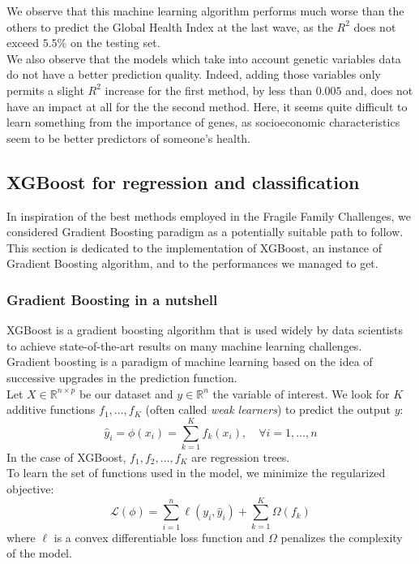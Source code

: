 \documentclass[]{article}
\begin{document}
\noindent
We observe that this machine learning algorithm performs much worse than the others to predict the Global Health Index at the last wave, as the $R^2$ does not exceed $5.5\%$ on the testing set.\\
We also observe that the models which take into account genetic variables data do not have a better prediction quality. Indeed, adding those variables only permits a slight $R^2$ increase for the first method, by less than $0.005$ and, does not have an impact at all for the the second method. Here, it seems quite difficult to learn something from the importance of genes, as socioeconomic characteristics seem to be better predictors of someone's health.

\subsection{XGBoost for regression and classification}
In inspiration of the best methods employed in the Fragile Family Challenges, we considered Gradient Boosting paradigm as a potentially suitable path to follow. This section is dedicated to the implementation of XGBoost, an instance of Gradient Boosting algorithm, and to the performances we managed to get.
\subsubsection{Gradient Boosting in a nutshell}
XGBoost \cite{xgboost2016} is a gradient boosting algorithm that is used widely by data scientists to achieve state-of-the-art results on many machine learning challenges.\\
Gradient boosting is a paradigm of machine learning based on the idea of successive upgrades in the prediction function.\\

\noindent
Let $X\in \mathbb{R}^{n\times p}$ be our dataset and $y\in \mathbb{R}^n$ the variable of interest. We look for $K$ additive functions $f_1,\dots,f_K$ (often called \textit{weak learners}) to predict the output $y$:
\begin{equation}
	\hat{y}_i = \phi(x_i) = \sum_{k=1}^K f_k(x_i),\quad \forall i=1, \dots, n
\end{equation}
In the case of XGBoost, $f_1,f_2,\dots,f_K$ are regression trees.\\
To learn the set of functions used in the model, we minimize the regularized objective:
\begin{equation}
	\label{xgboost_objective}
	\mathcal{L}(\phi) = \sum_{i=1}^n \ell(y_i, \hat{y}_i) + \sum_{k=1}^K\Omega(f_k)
\end{equation}
where $\ell$ is a convex differentiable loss function and $\Omega$ penalizes the complexity of the model.\\
\end{document}
